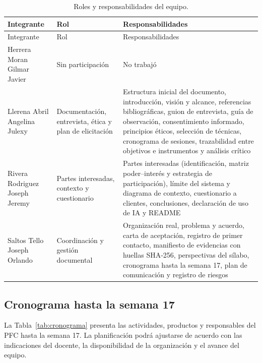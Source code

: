 \documentclass[11pt,a4paper]{article}
\begin{document}
	{\small
		\begin{xltabular}{\textwidth}{@{}lYY@{}}
			\caption{Roles y responsabilidades del equipo.}\label{tab:roles}\\
			\toprule
			Integrante & Rol & Responsabilidades \\
			\midrule
			\endfirsthead
			\toprule
			Integrante & Rol & Responsabilidades \\
			\midrule
			\endhead
			\bottomrule
			\endfoot
			
			Herrera Moran Gilmar Javier & Sin participación & No trabajó \\
			Llerena Abril Angelina Julexy & Documentación, entrevista, ética y plan de elicitación & Estructura inicial del documento, introducción, visión y alcance, referencias bibliográficas, guion de entrevista, guía de observación, consentimiento informado, principios éticos, selección de técnicas, cronograma de sesiones, trazabilidad entre objetivos e instrumentos y análisis crítico \\
			Rivera Rodriguez Joseph Jeremy & Partes interesadas, contexto y cuestionario & Partes interesadas (identificación, matriz poder--interés y estrategia de participación), límite del sistema y diagrama de contexto, cuestionario a clientes, conclusiones, declaración de uso de IA y README \\
			Saltos Tello Joseph Orlando & Coordinación y gestión documental & Organización real, problema y acuerdo, carta de aceptación, registro de primer contacto, manifiesto de evidencias con huellas SHA-256, perspectivas del sílabo, cronograma hasta la semana 17, plan de comunicación y registro de riesgos \\
		\end{xltabular}
	}
	
	
	\subsection{Cronograma hasta la semana 17}
	
	La Tabla~\ref{tab:cronograma} presenta las actividades, productos y responsables del PFC hasta la semana 17. La planificación podrá ajustarse de acuerdo con las indicaciones del docente, la disponibilidad de la organización y el avance del equipo.
	
\end{document}

